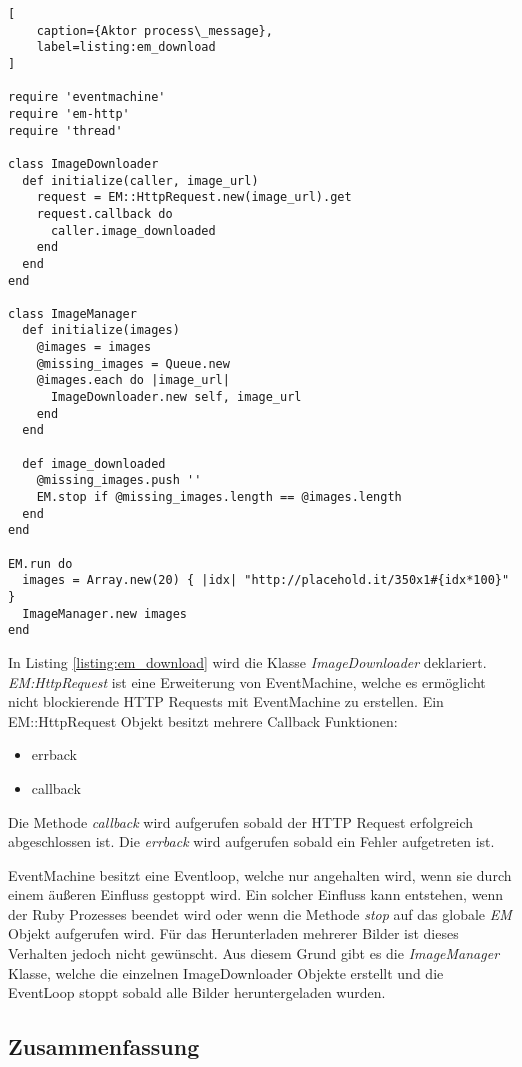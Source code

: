 \begin{lstlisting}[
	caption={Aktor process\_message},
	label=listing:em_download
]

require 'eventmachine'
require 'em-http'
require 'thread'

class ImageDownloader
  def initialize(caller, image_url)
    request = EM::HttpRequest.new(image_url).get
    request.callback do
      caller.image_downloaded
    end
  end
end

class ImageManager
  def initialize(images)
    @images = images
    @missing_images = Queue.new
    @images.each do |image_url|
      ImageDownloader.new self, image_url
    end
  end

  def image_downloaded
    @missing_images.push ''
    EM.stop if @missing_images.length == @images.length
  end
end

EM.run do
  images = Array.new(20) { |idx| "http://placehold.it/350x1#{idx*100}" }
  ImageManager.new images
end
\end{lstlisting}

In Listing \ref{listing:em_download} wird die Klasse \emph{ImageDownloader} deklariert. \emph{EM:HttpRequest} ist eine Erweiterung von EventMachine, welche es ermöglicht nicht blockierende HTTP Requests mit EventMachine zu erstellen. Ein EM::HttpRequest Objekt besitzt mehrere Callback Funktionen:

\begin{itemize}
  \item errback
  \item callback
\end{itemize}

Die Methode \emph{callback} wird aufgerufen sobald der HTTP Request erfolgreich abgeschlossen ist. Die \emph{errback} wird aufgerufen sobald ein Fehler aufgetreten ist.

EventMachine besitzt eine Eventloop, welche nur angehalten wird, wenn sie durch einem äußeren Einfluss gestoppt wird. Ein solcher Einfluss kann entstehen, wenn der Ruby Prozesses beendet wird oder wenn die Methode \emph{stop} auf das globale \emph{EM} Objekt aufgerufen wird. Für das Herunterladen mehrerer Bilder ist dieses Verhalten jedoch nicht gewünscht. Aus diesem Grund gibt es die \emph{ImageManager} Klasse, welche die einzelnen ImageDownloader Objekte erstellt und die EventLoop stoppt sobald alle Bilder heruntergeladen wurden. 

\subsection{Zusammenfassung}

